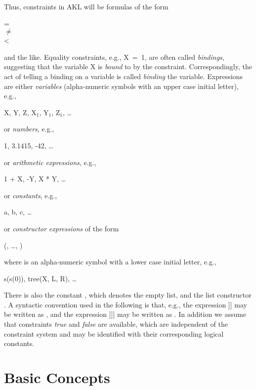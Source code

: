 Thus, constraints in AKL will be formulas of the form
%
\begin{progex}
 =  \\
 $\neq$  \\
 < 
\end{progex}%
%
and the like.  Equality constraints, e.g., {\prog X~=~1}, are often
called {\em bindings}, suggesting that the variable {\prog X} is {\em
bound} to {} by the constraint.  Correspondingly, the act of
telling a binding on a variable is called {\em binding} the variable.
Expressions are either {\em variables} (alpha-numeric symbols with an
upper case initial letter), e.g.,
%
\begin{progex}
X, Y, Z, X$_1$, Y$_1$, Z$_1$, \dots
\end{progex}%
or {\em numbers}, e.g.,
%
\begin{progex}
1, 3.1415, -42, \dots
\end{progex}%
%
or {\em arithmetic expressions}, e.g.,
%
\begin{progex}
1 + X, -Y, X * Y, \dots
\end{progex}%
%
or {\em constants}, e.g.,
%
\begin{progex}
a, b, c, \dots
\end{progex}%
%
or {\em constructor expressions} of the form
%
\begin{progex}
(, \dots, )
\end{progex}%
%
where  is an alpha-numeric symbol with a lower case initial
letter, e.g.,
%
\begin{progex}
s(s(0)), tree(X, L, R), \dots
\end{progex}%
%
There is also the constant {\prog []}, which denotes the empty list,
and the list constructor {}.  A
syntactic convention used in the following is that, e.g., the
expression {\prog [a|[b|[c|d]]]} may be written as {\prog
[a,\,b,\,c|d]}, and the expression {\prog [a|[b|[c|[]]]]} may be
written as {\prog [a,\,b,\,c]}.  In addition we assume that
constraints {\em true} and {\em false} are available, which are
independent of the constraint system and may be identified with their
corresponding logical constants.


\section{Basic Concepts}

